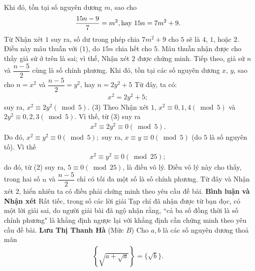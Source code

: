 \begin{multicols}{2}
	\vskip 0.05cm
	Khi đó, tồn tại số nguyên dương $m$, sao cho
	\begin{align*}
		\frac{{15n - 9}}{7} = {m^2}, \text{\color{
	black} hay } 15n = 7{m^2} + 9.
	\end{align*}
	Từ Nhận xét $1$ suy ra, số dư trong phép chia $7m^2 + 9$  cho $5$ sẽ là $4$, $1$, hoặc $2$. Điều này mâu thuẫn với ($1$), do $15n$ chia hết cho $5$. Mâu thuẫn nhận được cho thấy giả sử ở trên là sai; vì thế, Nhận xét $2$ được chứng minh.
	\vskip 0.05cm
	Tiếp theo, giả sử $n$ và $\dfrac{n-5}{2}$  cùng là số chính phương. Khi đó, tồn tại các số nguyên dương $x$, $y$, sao cho $n = x^2$  và $\dfrac{n-5}{2} = y^2$,  hay \linebreak$n = 2y^2 + 5$  Từ đây, ta có:
	\begin{align*}
		{x^2} = 2{y^2} + 5;
	\end{align*}
	suy ra, ${x^2} \equiv 2{y^2}\left( {\bmod 5} \right)$. \hfill ($3$)
	\vskip 0.05cm
	Theo Nhận xét $1$, ${x^2} \equiv 0,1,4\left( {\bmod 5} \right)$  và  $2{y^2} \equiv 0,2,3\left( {\bmod 5} \right)$.
	\vskip 0.05cm 
	Vì thế, từ ($3$) suy ra
	\begin{align*}
		{x^2} \equiv 2{y^2} \equiv 0\left( {\bmod 5} \right).
	\end{align*}
	Do đó, ${x^2} \equiv {y^2} \equiv 0\left( {\bmod 5} \right);$  suy ra, \linebreak $x \equiv y \equiv 0\left( {\bmod 5} \right)$  (do $5$ là số nguyên tố). Vì thế
	\begin{align*}
		{x^2} \equiv {y^2} \equiv 0\left( {\bmod 25} \right);
	\end{align*}
	do đó, từ ($2$) suy ra,  $5 \equiv 0\left( {\bmod 25} \right)$, là điều vô lý. Điều vô lý này cho thấy, trong hai số $n$ và $\dfrac{n-5}{2}$  chỉ có tối đa một số là số chính phương. Từ đây và Nhận xét $2$, hiển nhiên ta có điều phải chứng minh theo yêu cầu đề bài.
	\vskip 0.05cm
	\textbf{\color{thachthuctoanhoc}Bình luận và Nhận xét}
	\vskip 0.05cm
	Rất tiếc, trong số các lời giải Tạp chí đã nhận được từ bạn đọc, có một lời giải sai, do người giải bài đã ngộ nhận rằng, ``cả ba số đồng thời là số chính phương" là khẳng định ngược lại với khẳng định cần chứng minh theo yêu cầu đề bài.
	\vskip 0.05cm
	\hfill	\textbf{\color{thachthuctoanhoc}Lưu Thị Thanh Hà}
	\vskip 0.05cm
	{}
	(Mức $B$) Cho $a,b$ là các số nguyên dương thoả mãn
	\begin{align*}
		\left\{ \sqrt{a+\sqrt{a}}\right\}=\{\sqrt b\}.
	\end{align*}

\end{multicols}
